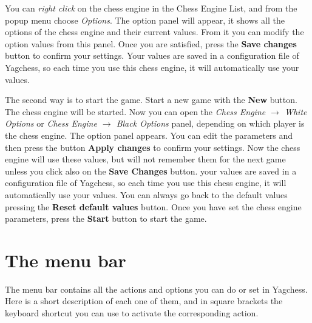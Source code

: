 \documentclass[a4paper]{article}
\newcommand{\nameprog}{Yagchess}
\begin{document}
You can \textit{right click} on the chess engine in the Chess Engine List, and from the popup menu choose \textit{Options}. The option panel will appear, it shows all the options
of the chess engine and their current values. From it you can modify the option values from this panel. Once you are satisfied, press the \textbf{Save changes} button to confirm
your settings. Your values are saved in a configuration file of \nameprog, so each time you use this chess engine, it will automatically use your values.

The second way is to start the game. Start a new game with the \textbf{New} button. The chess engine will be started. Now you can open the
\textit{Chess Engine $\rightarrow$ White Options} or \textit{Chess Engine $\rightarrow$ Black Options} panel, depending on which player is the chess engine. The option panel appears.
You can edit the parameters and then press the button \textbf{Apply changes} to confirm your settings. Now the chess engine will use these values, but will not remember them
for the next game unless you click also on the \textbf{Save Changes} button. your values are saved in a configuration file of \nameprog, so each time you use this chess engine,
it will automatically use your values. You can always go back to the default values pressing the \textbf{Reset default values} button. Once you have set the chess engine
parameters, press the \textbf{Start} button to start the game.


\section{The menu bar}
\label{menu}
The menu bar contains all the actions and options you can do or set in \nameprog. Here is a short description of each one of them, and
in square brackets the keyboard shortcut you can use to activate the corresponding action.
\end{document}

